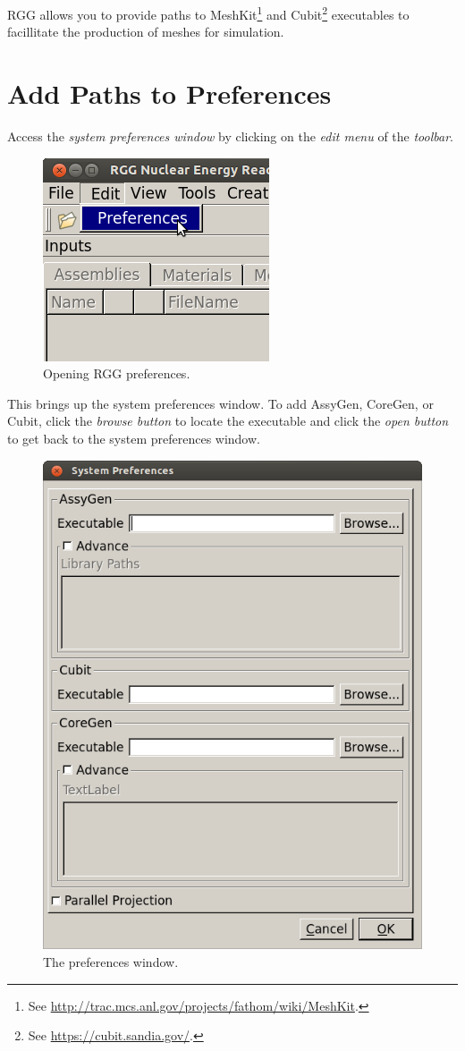 RGG allows you to provide paths to MeshKit\footnote{See \url{http://trac.mcs.anl.gov/projects/fathom/wiki/MeshKit}.} and Cubit\footnote{See \url{https://cubit.sandia.gov/}.} executables to facillitate the production of meshes for simulation.

\section{Add Paths to Preferences}

Access the \emph{system preferences window} by clicking on the \emph{edit menu} of the \emph{toolbar}.

\begin{figure}[H]
	\begin{center}
		\includegraphics[width=0.5\linewidth]{Images/mesh-1.png}
		\caption{Opening RGG preferences.}
		\label{fig:Mesh1}
	\end{center}
\end{figure}

This brings up the system preferences window.  To add AssyGen, CoreGen, or Cubit, click the \emph{browse button} to locate the executable and click the \emph{open button} to get back to the system preferences window.

\begin{figure}[H]
	\begin{center}
		\includegraphics[width=0.5\linewidth]{Images/mesh-2.png}
		\caption{The preferences window.}
		\label{fig:Mesh2}
	\end{center}
\end{figure}

